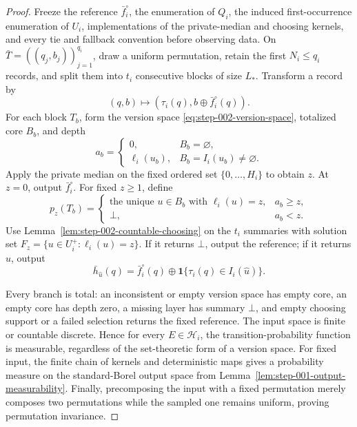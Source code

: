 \begin{proof}
Freeze the reference \(\bar f_i^\circ\), the enumeration of \(Q_i\), the
induced first-occurrence enumeration of \(U_i\), implementations of the
private-median and choosing kernels, and every tie and fallback convention
before observing data.  On
\(\bar T=((q_j,b_j))_{j=1}^{q_i}\), draw a uniform permutation, retain the
first \(N_i\le q_i\) records, and split them into \(t_i\) consecutive blocks
of size \(L_*\).  Transform a record by
\begin{equation}\label{eq:step-002-record-transform}
(q,b)\longmapsto(\tau_i(q),b\oplus\bar f_i^\circ(q)).
\end{equation}
For each block \(T_b\), form the version space
\eqref{eq:step-002-version-space}, totalized core \(B_b\), and depth
\begin{equation}\label{eq:step-002-block-depth}
a_b=\begin{cases}
0,&B_b=\varnothing,\\
\ell_i(u_b),&B_b=I_i(u_b)\ne\varnothing.
\end{cases}
\end{equation}
Apply the private median on the fixed ordered set \(\{0,\ldots,H_i\}\) to
obtain \(z\).  At \(z=0\), output \(\bar f_i^\circ\).  For fixed
\(z\ge1\), define
\begin{equation}\label{eq:step-002-layer-summary}
p_z(T_b)=\begin{cases}
\text{the unique }u\in B_b\text{ with }\ell_i(u)=z,&a_b\ge z,\\
\bot,&a_b<z.
\end{cases}
\end{equation}
Use Lemma~\ref{lem:step-002-countable-choosing} on the \(t_i\) summaries
with solution set \(F_z=\{u\in U_i^+:\ell_i(u)=z\}\).  If it returns
\(\bot\), output the reference; if it returns \(\hat u\), output
\begin{equation}\label{eq:step-002-factor-output}
\bar h_{\hat u}(q)=\bar f_i^\circ(q)
\oplus\mathbf1\{\tau_i(q)\in I_i(\hat u)\}.
\end{equation}

Every branch is total: an inconsistent or empty version space has empty
core, an empty core has depth zero, a missing layer has summary \(\bot\),
and empty choosing support or a failed selection returns the fixed reference.
The input space is finite or countable discrete.  Hence for every
\(E\in\mathscr H_i\), the transition-probability function is measurable,
regardless of the set-theoretic form of a version space.  For fixed input,
the finite chain of kernels and deterministic maps gives a probability
measure on the standard-Borel output space from
Lemma~\ref{lem:step-001-output-measurability}.  Finally, precomposing the
input with a fixed permutation merely composes two permutations while the
sampled one remains uniform, proving permutation invariance.
\end{proof}

